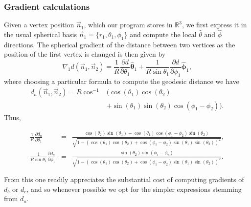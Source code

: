 \documentclass[aps,pre,reprint,superscriptaddress,nofootinbib]{revtex4-2}
\begin{document}
%
%
\subsubsection{Gradient calculations}
Given a vertex position $\vec{n}_1$, which our program stores in $\mathbb{R}^3$, we first express it in the usual spherical basis $\vec{n}_1 = \{r_1,\theta_1,\phi_1\}$ and compute the local $\hat{\theta}$ and $\hat{\phi}$ directions. The spherical gradient of the distance between two vertices as the position of the first vertex is changed is then given by
\begin{equation}
\nabla_1 d(\vec{n}_1,\vec{n}_2) = \frac{1}{R} \frac{\partial d}{\partial \theta_1}\hat{\mathbf{\theta}}_1 +\frac{1}{R\sin\theta_1} \frac{\partial d}{\partial \phi_1}\hat{\mathbf{\phi}}_1,
\end{equation}
where choosing a particular formula to compute the geodesic distance we have
\begin{align}
d_a(\vec{n}_1,\vec{n}_2) = R \cos^{-1}&\big( \cos(\theta_1)\cos(\theta_2)  \\&+ \sin(\theta_1) \sin(\theta_2)\cos(\phi_1-\phi_2)\big). 
\end{align}
Thus,
\begin{widetext}
\begin{eqnarray}
\frac{1}{R} \frac{\partial d_a}{\partial \theta_1} &=& \frac{\cos(\theta_2)\sin(\theta_1) - \cos(\theta_1) \cos(\phi_1-\phi_2) \sin(\theta_2)}{\sqrt{1-\left(\cos(\theta_1)\cos(\theta_2) + \cos(\phi_1-\phi_2) \sin(\theta_1)\sin(\theta_2) \right)^2}}, \\
\frac{1}{R\sin\theta_1} \frac{\partial d_a}{\partial \phi_1}&=& \frac{\sin(\theta_2) \sin(\phi_1-\phi_2)}{\sqrt{1-\left(\cos(\theta_1)\cos(\theta_2) + \cos(\phi_1-\phi_2) \sin(\theta_1)\sin(\theta_2) \right)^2}}.
\end{eqnarray}
\end{widetext}
From this one readily appreciates the substantial cost of computing gradients of $d_b$ or $d_c$, and so whenever possible we opt for the simpler expressions stemming from $d_a$.
\end{document}
